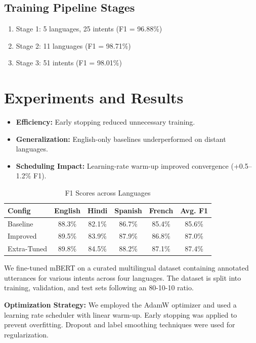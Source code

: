 \documentclass{ecai}
\begin{document}
\subsection{Training Pipeline Stages}
\begin{enumerate}
    \item Stage 1: 5 languages, 25 intents (F1 = 96.88\%)
    \item Stage 2: 11 languages (F1 = 98.71\%)
    \item Stage 3: 51 intents (F1 = 98.01\%)
\end{enumerate}

\section{Experiments and Results}
\begin{itemize}
    \item \textbf{Efficiency:} Early stopping reduced unnecessary training.
    \item \textbf{Generalization:} English-only baselines underperformed on distant languages.
    \item \textbf{Scheduling Impact:} Learning-rate warm-up improved convergence (+0.5–1.2\% F1).
\end{itemize}

\begin{table}[H]
\centering
\caption{F1 Scores across Languages}
\begin{tabular}{lcccc|c}
\toprule
Config & English & Hindi & Spanish & French & Avg. F1 \\
\midrule
Baseline & 88.3\% & 82.1\% & 86.7\% & 85.4\% & 85.6\% \\
Improved & 89.5\% & 83.9\% & 87.9\% & 86.8\% & 87.0\% \\
Extra-Tuned & 89.8\% & 84.5\% & 88.2\% & 87.1\% & 87.4\% \\
\bottomrule
\end{tabular}
\end{table}

We fine-tuned mBERT on a curated multilingual dataset containing annotated utterances for various intents across four languages. The dataset is split into training, validation, and test sets following an 80-10-10 ratio.

\textbf{Optimization Strategy:} We employed the AdamW optimizer and used a learning rate scheduler with linear warm-up. Early stopping was applied to prevent overfitting. Dropout and label smoothing techniques were used for regularization.
\end{document}
